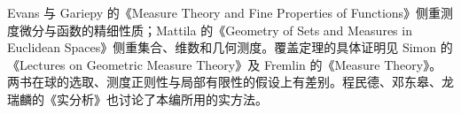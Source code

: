 \ProseParagraphBreak

Evans 与 Gariepy 的《Measure Theory and Fine Properties of Functions》\cite{Evans2015Measure}侧重测度微分与函数的精细性质；Mattila 的《Geometry of Sets and Measures in Euclidean Spaces》\cite{Mattila1995Geometry}侧重集合、维数和几何测度。覆盖定理的具体证明见 Simon 的《Lectures on Geometric Measure Theory》\cite[\S\S3--4]{Simon1983Lectures}及 Fremlin 的《Measure Theory》\cite[\S472]{Fremlin2016Measure}。两书在球的选取、测度正则性与局部有限性的假设上有差别。程民德、邓东皋、龙瑞麟的《实分析》\cite[第三章]{Cheng2008RealAnalysis}也讨论了本编所用的实方法。








